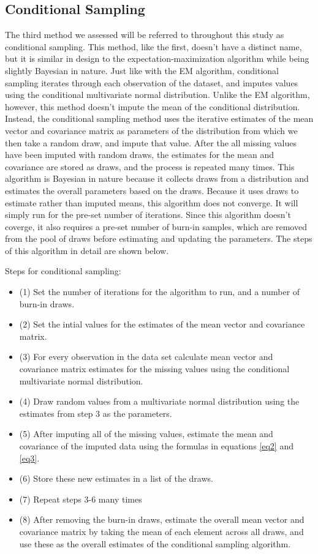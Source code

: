\documentclass{svproc}
\begin{document}
\subsection{Conditional Sampling}
The third method we assessed will be referred to throughout this study as conditional sampling. This method, like the first, doesn't have a distinct name, but it is similar in design to the expectation-maximization algorithm while being slightly Bayesian in nature. Just like with the EM algorithm, conditional sampling iterates through each observation of the dataset, and imputes values using the conditional multivariate normal distribution. Unlike the EM algorithm, however, this method doesn't impute the mean of the conditional distribution. Instead, the conditional sampling method uses the iterative estimates of the mean vector and covariance matrix as parameters of the distribution from which we then take a random draw, and impute that value. After the all missing values have been imputed with random draws, the estimates for the mean and covariance are stored as draws, and the process is repeated many times. This algorithm is Bayesian in nature because it collects draws from a distribution and estimates the overall parameters based on the draws. Because it uses draws to estimate rather than imputed means, this algorithm does not converge. It will simply run for the pre-set number of iterations. Since this algorithm doesn't coverge, it also requires a pre-set number of burn-in samples, which are removed from the pool of draws before estimating and updating the parameters. The steps of this algorithm in detail are shown below.

Steps for conditional sampling:
\begin{itemize}
\item (1) Set the number of iterations for the algorithm to run, and a number of burn-in draws.
\item (2) Set the intial values for the estimates of the mean vector and covariance matrix.
\item (3) For every observation in the data set calculate mean vector and covariance matrix estimates for the missing values using the conditional multivariate normal distribution.
\item (4) Draw random values from a multivariate normal distribution using the estimates from step 3 as the parameters.
\item (5) After imputing all of the missing values, estimate the mean and covariance of the imputed data using the formulas in equations \ref{eq2} and \ref{eq3}.
\item (6) Store these new estimates in a list of the draws.
\item (7) Repeat steps 3-6 many times
\item (8) After removing the burn-in draws, estimate the overall mean vector and covariance matrix by taking the mean of each element across all draws, and use these as the overall estimates of the conditional sampling algorithm.
\end{itemize}
\end{document}
